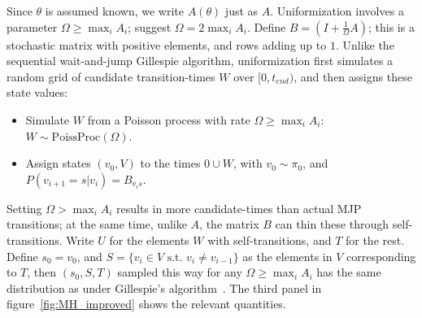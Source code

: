 Since $\theta$ is assumed known, we write $A(\theta)$ just as $A$. 
Uniformization involves a parameter $\Omega \ge \max_i A_i$; \cite{RaoTeh13} suggest $\Omega = 2 \max_i A_i$. 
Define $B = \left(I +\frac{1}{\Omega}A\right)$; this is a stochastic matrix with positive elements, and rows adding up to $1$.
Unlike the sequential wait-and-jump Gillespie algorithm, uniformization first simulates a random grid of candidate transition-times $W$ over $[0,t_{end})$, and then assigns these state values:
\begin{itemize}
  \item Simulate $W$ from a Poisson process with rate $\Omega \ge \max_i A_i$: 
    $W \sim \text{PoissProc}(\Omega)$.
  \item Assign states $(v_0,V)$ to the times $0 \cup W$, with $v_0 \sim \pi_0$, and $P(v_{i+1}=s|v_i) = B_{v_is}$.
\end{itemize}
Setting $\Omega > \max_i A_i$ results in more candidate-times than actual MJP transitions; at the same time, unlike $A$, the matrix $B$ can thin these through self-transitions. 
Write $U$ for the elements $W$ with self-transitions, and $T$ for the rest.
Define $s_0=v_0$, and $S=\{v_i \in V \text{ s.t.\ } v_i \neq v_{i-1}\}$ as the elements in $V$ corresponding to $T$, then $(s_0,S,T)$ sampled this way for any $\Omega \ge \max_i A_i$
has the same distribution as under Gillespie's algorithm~\citep{Jen1953,RaoTeh13}. The third panel in figure~\ref{fig:MH_improved} shows the relevant quantities.

